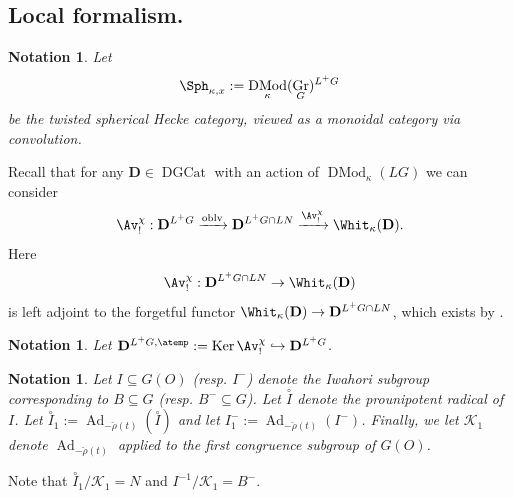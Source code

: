 \documentclass[9pt]{amsart}
\DeclareMathOperator{\Gra}{{Gr}}
\newcommand{\cK}{{\mathcal K}}
\DeclareMathOperator{\DGCat}{{DGCat}}
\DeclareMathOperator{\oblv}{{oblv}}
\DeclareMathOperator{\Ker}{{Ker}} \DeclareMathOperator{\id}{{id}}
\DeclareMathOperator{\Ad}{{Ad}}
\newtheorem{ntn}[subsubsection]{Notation}
\numberwithin{equation}{section}
\DeclareMathOperator{\D}{{DMod}}
\begin{document}
\subsection{Local formalism.}
\begin{ntn}
	Let $$\Sph_{\kappa, x}:=\D_{\kappa} (\Gra_G)^{L^+G}$$ be the twisted spherical Hecke category, viewed as a monoidal category via convolution.
\end{ntn}
 Recall that for any $\mathbf{D} \in \DGCat$ with an action of $\D_{\kappa}(LG)$ we can consider
\begin{equation}\label{av}
\Av_!^{\chi}: \mathbf{D}^{L^+G} \xrightarrow{\oblv} \mathbf{D}^{L^+G \cap LN} \xrightarrow{\Av_!^{\chi}} \Whit_{\kappa}(\mathbf{D}).
\end{equation}
Here $$\Av_!^{\chi}: \mathbf{D}^{L^+G \cap LN} \rightarrow \Whit_{\kappa}(\mathbf{D})$$ is left adjoint to the forgetful functor $\Whit_{\kappa}(\mathbf{D}) \rightarrow \mathbf{D}^{L^+G \cap LN}$, which exists by \cite[Theorem 2.3.1]{R}.
\begin{ntn}
	Let $\mathbf{D}^{L^+G, \atemp} := \Ker\Av_!^{\chi} \hookrightarrow \mathbf{D}^{L^+G}$.
\end{ntn}

\begin{ntn}
	Let $I \subseteq G(O)$ (resp. $I^-$) denote the Iwahori subgroup corresponding to $B \subseteq G $ (resp. $B^{-} \subseteq G$).
Let $\stackrel{\circ}{I}$ denote the prounipotent radical of $I$. Let $\stackrel{\circ}{I}_1 := \Ad_{-\check{\rho}(t)}(\stackrel{\circ}{I})$ and let $I^-_1 := \Ad_{-\check{\rho}(t)}(I^-)$. Finally,
we let $\cK_1$ denote $\Ad_{-\check{\rho}(t)}$ applied to the first congruence subgroup of $G(O)$.
\end{ntn}
Note that $\stackrel{\circ}{I}_1 /\cK_1 = N$ and $I^{-1} /\cK_1 = B^-$.
\end{document}
